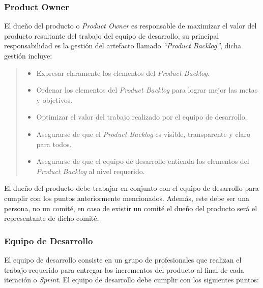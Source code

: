 \subsubsection{Product Owner}

 \noindent El dueño del producto o {\em Product Owner} es responsable de maximizar el valor
 del producto resultante del trabajo del equipo de desarrollo, su principal responsabilidad
 es la gestión del artefacto llamado {\em``Product Backlog''}, dicha gestión incluye:

    \begin{quote}
    \begin{itemize}
        \item Expresar claramente los elementos del {\it Product Backlog}.
        \item Ordenar los elementos del {\it Product Backlog} para lograr mejor las metas y
               objetivos.
        \item Optimizar el valor del trabajo realizado por el equipo de desarrollo.
        \item Asegurarse de que el {\it Product Backlog} es visible, transparente y claro para todos.
        \item Asegurarse de que el equipo de desarrollo entienda los elementos del {\it Product
               Backlog} al nivel requerido.\\
    \end{itemize}
    \end{quote}

 \noindent El dueño del producto debe trabajar en conjunto con el equipo de desarrollo para
 cumplir con los puntos anteriormente mencionados. Además, este debe ser una persona, no un comité,
 en caso de existir un comité el dueño del producto será el representante de dicho comité.

\subsubsection{Equipo de Desarrollo}

 El equipo de desarrollo consiste en un grupo de profesionales que realizan el 
 trabajo requerido para entregar los incrementos del producto al final de cada 
 iteración o {\it Sprint}. El equipo de desarrollo debe cumplir con los siguientes 
 puntos:


